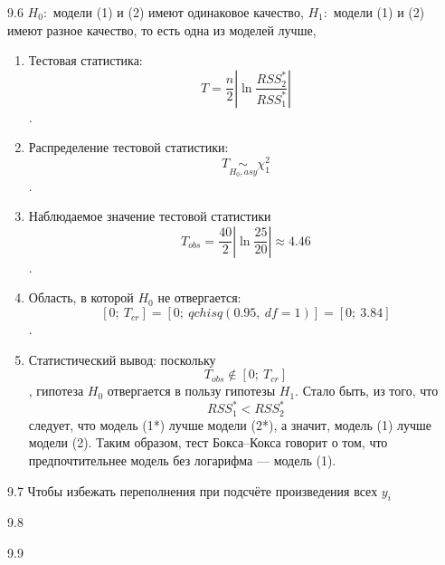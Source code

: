 \begin{solution}{{9.6}}
  $H_0:$ модели (1) и (2) имеют одинаковое качество,
  $H_1:$ модели (1) и (2) имеют разное качество, то есть одна из моделей лучше,
\begin{enumerate}
\item Тестовая статистика: \[T=\frac{n}{2}\left| \ln \frac{RSS_{2}^{*}}{RSS_{1}^{*}} \right|\].
\item Распределение тестовой статистики: \[T\underset{H_0, asy}{\sim} \chi^2_1 \].
\item Наблюдаемое значение тестовой статистики \[{{T}_{obs}}=\frac{40}{2}\left| \ln \frac{25}{20} \right|\approx \text{4.46}\].
\item Область, в которой $H_0$ не отвергается: \[[0;\ {{T}_{cr}}]=[0;\ qchisq(0.95,\ df=1)]=[0;\ \text{3.84}]\].
\item Статистический вывод: поскольку \[{{T}_{obs}}\notin [0;\ {{T}_{cr}}]\], гипотеза $H_0$ отвергается в пользу гипотезы $H_1$. Стало быть, из того, что \[RSS_{1}^{*}<RSS_{2}^{*}\] следует, что модель (1*) лучше модели (2*), а значит, модель (1) лучше модели (2). Таким образом, тест Бокса–Кокса говорит о том, что предпочтительнее модель без логарифма — модель (1).
\end{enumerate}

\end{solution}
\protect \hypertarget {soln:9.7}{}
\begin{solution}{{9.7}}
Чтобы избежать переполнения при подсчёте произведения всех $y_i$
\end{solution}
\protect \hypertarget {soln:9.8}{}
\begin{solution}{{9.8}}
\end{solution}
\protect \hypertarget {soln:9.9}{}
\begin{solution}{{9.9}}
\end{solution}
